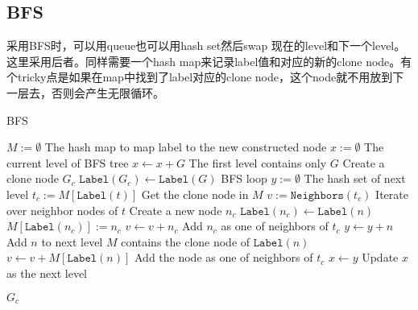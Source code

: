\subsection{BFS}
采用BFS时，可以用queue也可以用hash set然后swap 现在的level和下一个level。这里采用后者。同样需要一个hash map来记录label值和对应的新的clone node。有个tricky点是如果在map中找到了label对应的clone node，这个node就不用放到下一层去，否则会产生无限循环。
\begin{algorithm}[H]
\caption{BFS}
\begin{algorithmic}[1]
\State $M:=\emptyset$ \Comment The hash map to map label to the new constructed node
\State $x:=\emptyset$ \Comment The current level of BFS tree
\State $x\gets x + G$ \Comment The first level contains only $G$
\State Create a clone node $G_c$
\State $\texttt{Label}(G_c)\gets \texttt{Label}(G)$
 \Comment BFS loop
\State $y:=\emptyset$ \Comment The hash set of next level
\State $t_c:=M[\texttt{Label}(t)]$ \Comment Get the clone node in $M$
\State $v:=\texttt{Neighbors}(t_c)$
 \Comment Iterate over neighbor nodes of $t$
\State Create a new node $n_c$
\State $\texttt{Label}(n_c)\gets \texttt{Label}(n)$
\State $M[\texttt{Label}(n_c)]:=n_c$
\State $v\gets v+ n_c$ \Comment Add $n_c$ as one of neighbors of $t_c$
\State $y\gets y+n$ \Comment Add $n$ to next level
\Else \Comment $M$ contains the clone node of $\texttt{Label}(n)$
\State $v\gets v+M[\texttt{Label}(n)]$ \Comment Add the node as one of neighbors of $t_c$
\EndIf
\EndFor
\EndFor
\State $x\gets y$ \Comment Update $x$ as the next level
\end{algorithmic}
\end{algorithm}
\begin{algorithm}[H]
\begin{algorithmic}[1]
\EndWhile
\State \Return $G_c$
\EndProcedure
\end{algorithmic}
\end{algorithm}
